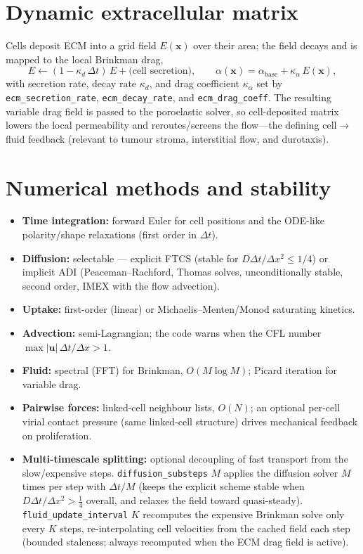 \documentclass[11pt]{article}
\newcommand{\vu}{\bm{u}}
\newcommand{\vx}{\bm{x}}
\newcommand{\dt}{\Delta t}
\newcommand{\dx}{\Delta x}
\begin{document}
\section{Dynamic extracellular matrix}\label{sec:ecm}

Cells deposit ECM into a grid field $E(\vx)$ over their area; the field decays
and is mapped to the local Brinkman drag,
\begin{equation}
  E \leftarrow (1 - \kappa_d\,\dt)\,E + \text{(cell secretion)}, \qquad
  \alpha(\vx) = \alpha_{\text{base}} + \kappa_\alpha\,E(\vx),
\end{equation}
with secretion rate, decay rate $\kappa_d$, and drag coefficient $\kappa_\alpha$
set by \texttt{ecm\_secretion\_rate}, \texttt{ecm\_decay\_rate}, and
\texttt{ecm\_drag\_coeff}. The resulting variable drag field is passed to the
poroelastic solver, so cell-deposited matrix lowers the local permeability and
reroutes/screens the flow---the defining cell$\to$fluid feedback (relevant to
tumour stroma, interstitial flow, and durotaxis).

\section{Numerical methods and stability}

\begin{itemize}
  \item \textbf{Time integration:} forward Euler for cell positions and the
        ODE-like polarity/shape relaxations (first order in $\dt$).
  \item \textbf{Diffusion:} selectable --- explicit FTCS (stable for
        $D\dt/\dx^2 \le 1/4$) or implicit ADI (Peaceman--Rachford, Thomas solves,
        unconditionally stable, second order, IMEX with the flow advection).
  \item \textbf{Uptake:} first-order (linear) or Michaelis--Menten/Monod
        saturating kinetics.
  \item \textbf{Advection:} semi-Lagrangian; the code warns when the CFL number
        $\max\lvert\vu\rvert\,\dt/\dx > 1$.
  \item \textbf{Fluid:} spectral (FFT) for Brinkman, $O(M\log M)$; Picard
        iteration for variable drag.
  \item \textbf{Pairwise forces:} linked-cell neighbour lists, $O(N)$; an optional
        per-cell virial contact pressure (same linked-cell structure) drives
        mechanical feedback on proliferation.
  \item \textbf{Multi-timescale splitting:} optional decoupling of fast transport
        from the slow/expensive steps. \texttt{diffusion\_substeps} $M$ applies the
        diffusion solver $M$ times per step with $\dt/M$ (keeps the explicit scheme
        stable when $D\dt/\dx^2>\tfrac14$ overall, and relaxes the field toward
        quasi-steady). \texttt{fluid\_update\_interval} $K$ recomputes the
        expensive Brinkman solve only every $K$ steps, re-interpolating cell
        velocities from the cached field each step (bounded staleness; always
        recomputed when the ECM drag field is active).
\end{itemize}
\end{document}

